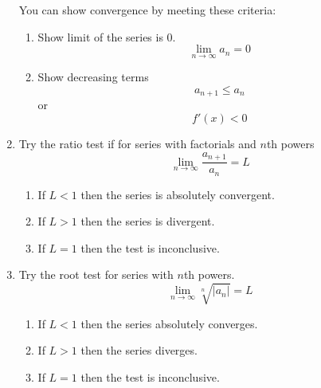 \documentclass{article}
\begin{document}
\begin{enumerate}
        You can show convergence by meeting these criteria:
        \begin{enumerate}
            \item Show limit of the series is 0. \[\lim_{n \to \infty} a_n = 0\]
            \item Show decreasing terms \[a_{n+1} \leq a_n \] or \[f'(x) < 0\]
        \end{enumerate}
        \item Try the ratio test if for series with factorials and \(n\)th powers
        \[\lim_{n \to \infty} \frac{a_{n+1}}{a_n} = L \]
        \begin{enumerate}
            \item If \(L < 1\) then the series is absolutely convergent.
            \item If \(L > 1\) then the series is divergent.
            \item If \(L = 1\) then the test is inconclusive.
        \end{enumerate}
        \item Try the root test for series with \(n\)th powers. 
        \[\lim_{n \to \infty} \sqrt[n]{\left| a_n \right|} = L\] 
        \begin{enumerate}
            \item If \(L < 1\) then the series absolutely converges.
            \item If \(L > 1\) then the series diverges.
            \item If \(L = 1\) then the test is inconclusive.
        \end{enumerate}
    \end{enumerate}
    
\end{document}
